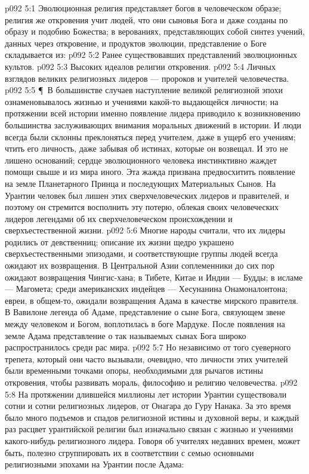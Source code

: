\vs p092 5:1 Эволюционная религия представляет богов в человеческом образе; религия же откровения учит людей, что они сыновья Бога и даже созданы по образу и подобию Божества; в верованиях, представляющих собой синтез учений, данных через откровение, и продуктов эволюции, представление о Боге складывается из:
\vs p092 5:2 \bibnobreakspace Ранее существовавших представлений эволюционных культов.
\vs p092 5:3 \bibnobreakspace Высоких идеалов религии откровения.
\vs p092 5:4 \bibnobreakspace Личных взглядов великих религиозных лидеров --- пророков и учителей человечества.
\vs p092 5:5 \P\ В большинстве случаев наступление великой религиозной эпохи ознаменовывалось жизнью и учениями какой\hyp{}то выдающейся личности; на протяжении всей истории именно появление лидера приводило к возникновению большинства заслуживающих внимания моральных движений в истории. И люди всегда были склонны преклоняться перед учителем, даже в ущерб его учениям; чтить его личность, даже забывая об истинах, которые он возвещал. И это не лишено оснований; сердце эволюционного человека инстинктивно жаждет помощи свыше и из мира иного. Эта жажда призвана предвосхитить появление на земле Планетарного Принца и последующих Материальных Сынов. На Урантии человек был лишен этих сверхчеловеческих лидеров и правителей, и поэтому он стремится восполнить эту потерю, облекая своих человеческих лидеров легендами об их сверхчеловеческом происхождении и сверхъестественной жизни.
\vs p092 5:6 Многие народы считали, что их лидеры родились от девственниц; описание их жизни щедро украшено сверхъестественными эпизодами, и соответствующие группы людей всегда ожидают их возвращения. В Центральной Азии соплеменники до сих пор ожидают возвращения Чингис\hyp{}хана; в Тибете, Китае и Индии --- Будды; в исламе --- Магомета; среди американских индейцев --- Хесунанина Онамоналонтона; евреи, в общем\hyp{}то, ожидали возвращения Адама в качестве мирского правителя. В Вавилоне легенда об Адаме, представление о сыне Бога, связующем звене между человеком и Богом, воплотилась в боге Мардуке. После появления на земле Адама представление о так называемых сынах Бога широко распространилось среди рас мира.
\vs p092 5:7 Но независимо от того суеверного трепета, который они часто вызывали, очевидно, что личности этих учителей были временными точками опоры, необходимыми для рычагов истины откровения, чтобы развивать мораль, философию и религию человечества.
\vs p092 5:8 На протяжении длившейся миллионы лет истории Урантии существовали сотни и сотни религиозных лидеров, от Онагара до Гуру Нанака. За это время было много подъемов и спадов религиозной истины и духовной веры, и каждый раз расцвет урантийской религии был изначально связан с жизнью и учениями какого\hyp{}нибудь религиозного лидера. Говоря об учителях недавних времен, может быть, полезно сгруппировать их в соответствии с семью основными религиозными эпохами на Урантии после Адама:
